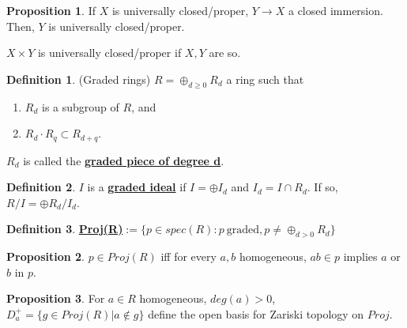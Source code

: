 \documentclass{article}
\theoremstyle{definition}
\theoremstyle{definition}
\newtheorem{definition}{Definition}[theorem]
\theoremstyle{definition}
\theoremstyle{definition}
\newtheorem{proposition}{Proposition}[theorem]
\theoremstyle{definition}
\theoremstyle{definition}
\theoremstyle{definition}
\begin{document}
\begin{tcolorbox}[colback=blue!5!white,colframe=blue!30!white]
\begin{proposition}
If $X$ is universally closed/proper, $Y\to X$ a closed immersion. Then, $Y$ is universally closed/proper. 

$X\times Y$ is universally closed/proper if $X,Y$ are so.
\end{proposition}
\end{tcolorbox}


\begin{tcolorbox}[colback=purple!5!white,colframe=purple!75!black]
\begin{definition}
(Graded rings) $R=\oplus_{d\geq 0} R_d$ a ring such that 
\begin{enumerate}
    \item $R_d$ is a subgroup of $R$, and 
    \item $R_d\cdot R_q\subset R_{d+q}$.
\end{enumerate}
$R_d$ is called the \underline{\textbf{graded piece of degree d}}. 
\end{definition}
\end{tcolorbox}


\begin{tcolorbox}[colback=purple!5!white,colframe=purple!75!black]
\begin{definition}
    $I$ is a \underline{\textbf{graded ideal}} if $I=\oplus I_d$ and $I_d=I\cap R_d$. If so, $R/I=\oplus R_d/I_d$. 
\end{definition}
\end{tcolorbox}


\begin{tcolorbox}[colback=purple!5!white,colframe=purple!75!black]
\begin{definition}
\underline{\textbf{Proj(R)}}$:= \{ p\in spec(R) :p \ \textrm{graded}, p\neq \oplus_{d>0}R_d \} $
\end{definition}
\end{tcolorbox}


\begin{tcolorbox}[colback=blue!5!white,colframe=blue!30!white]
\begin{proposition}
$p\in Proj(R)$ iff for every $a,b$ homogeneous, $ab\in p$ implies $a$ or $b$ in $p$.
\end{proposition}
\end{tcolorbox}


\begin{tcolorbox}[colback=blue!5!white,colframe=blue!30!white]
\begin{proposition}
For $a\in R$ homogeneous, $deg(a)>0$, $D_a^{+}=\{g\in Proj(R)| a\not\in g\}$ define the open basis for Zariski topology on $Proj$. 
\end{proposition}
\end{tcolorbox}
\end{document}
